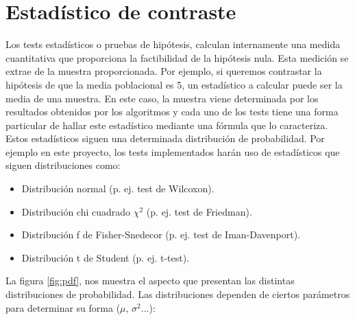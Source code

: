 \section{Estadístico de contraste} \label{estadistico}
Los tests estadísticos o pruebas de hipótesis, calculan internamente una medida cuantitativa que proporciona la
factibilidad de la hipótesis nula. Esta medición se extrae de la muestra proporcionada. Por ejemplo, si queremos
contrastar la hipótesis de que la media poblacional es 5, un estadístico a calcular puede ser la media de una
muestra. En este caso, la muestra viene determinada por los resultados obtenidos por los algoritmos y cada uno de
los tests tiene una forma particular de hallar este estadístico mediante una fórmula que lo caracteriza. Estos
estadísticos siguen una determinada distribución de probabilidad. Por ejemplo en este proyecto, los tests
implementados harán uso de estadísticos que siguen distribuciones como:
\begin{itemize}
\item Distribución normal (p. ej. test de Wilcoxon).
\item Distribución chi cuadrado $\chi^2$ (p. ej. test de Friedman).
\item Distribución f de Fisher-Snedecor (p. ej. test de Iman-Davenport).
\item Distribución t de Student (p. ej. t-test).
\end{itemize}
La figura \ref{fig:pdf}, nos muestra el aspecto que presentan las distintas distribuciones de probabilidad. Las
distribuciones dependen de ciertos parámetros para determinar su forma ($\mu$, $\sigma^2$...): 
\begin{figure}[h]
\centering
{}
\end{figure}
